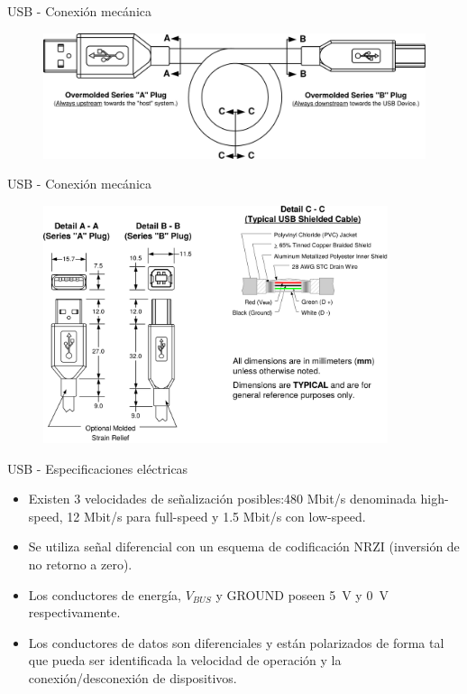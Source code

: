 \documentclass[11pt,a4paper]{beamer}
\begin{document}
			\begin{frame}{USB - Conexión mecánica}
				\begin{figure}
					\includegraphics[width=.9\textwidth]{usbcableb.png}
				\end{figure}
			\end{frame}
			\begin{frame}{USB - Conexión mecánica}
				\begin{figure}
					\includegraphics[width=0.9\textwidth]{usbcablea.png}
				\end{figure}
			\end{frame}
			\begin{frame}{USB - Especificaciones eléctricas}
				\begin{itemize}
					\item Existen 3 velocidades de señalización posibles:480 Mbit/s denominada high-speed, 12 Mbit/s para full-speed y 1.5 Mbit/s con low-speed.
					\item Se utiliza señal diferencial con un esquema de codificación NRZI (inversión de no retorno a zero).
					\item Los conductores de energía, $V_{BUS}$ y GROUND poseen \SI{5}{\volt} y \SI{0}{\volt} respectivamente.
					\item Los conductores de datos son diferenciales y están polarizados de forma tal que pueda ser identificada la velocidad de operación y la conexión/desconexión de dispositivos.
				\end{itemize}
			\end{frame}
\end{document}
